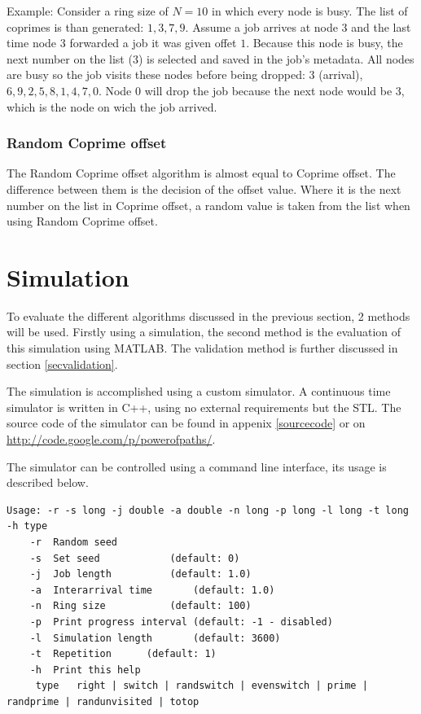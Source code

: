 \documentclass[10pt,a4paper,titlepage]{article}
\begin{document}
Example:
Consider a ring size of $N=10$ in which every node is busy. The list of coprimes is than generated: ${1, 3, 7, 9}$. Assume a job arrives at node $3$ and the last time node $3$ forwarded a job it was given offet $1$.
Because this node is busy, the next number on the list ($3$) is selected and saved in the job's metadata. All nodes are busy so the job visits these nodes before being dropped: $3$ (arrival), $6, 9, 2, 5, 8, 1, 4, 7, 0$. Node $0$ will drop the job because the next node would be $3$, which is the node on wich the job arrived.

\subsubsection{Random Coprime offset}
The Random Coprime offset algorithm is almost equal to Coprime offset. The difference between them is the decision of the offset value. Where it is the next number on the list in Coprime offset, a random value is taken from the list when using Random Coprime offset.

\section{Simulation}
To evaluate the different algorithms discussed in the previous section, 2 methods will be used. Firstly using a simulation, the second method is the evaluation of this simulation using MATLAB. The validation method is further discussed in section \ref{secvalidation}.

The simulation is accomplished using a custom simulator. A continuous time simulator is written in C++, using no external requirements but the STL. The source code of the simulator can be found in appenix \ref{sourcecode} or on \url{http://code.google.com/p/powerofpaths/}.

The simulator can be controlled using a command line interface, its usage is described below.

\begin{lstlisting}
Usage: -r -s long -j double -a double -n long -p long -l long -t long -h type
	-r	Random seed
	-s	Set seed			(default: 0)
	-j	Job length			(default: 1.0)
	-a	Interarrival time		(default: 1.0)
	-n	Ring size			(default: 100)
	-p	Print progress interval	(default: -1 - disabled)
	-l	Simulation length		(default: 3600)
	-t	Repetition		(default: 1)
	-h	Print this help
	 type	right | switch | randswitch | evenswitch | prime | randprime | randunvisited | totop
\end{lstlisting}
\end{document}
